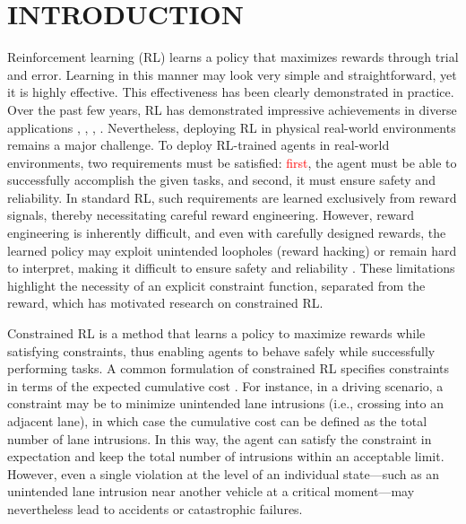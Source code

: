 \section{INTRODUCTION}

Reinforcement learning (RL) learns a policy that maximizes rewards through trial and error.
Learning in this manner may look very simple and straightforward, yet it is highly effective.
This effectiveness has been clearly demonstrated in practice.
Over the past few years, RL has demonstrated impressive achievements in diverse applications \cite{silver2017mastering}, \cite{andrychowicz2020learning}, \cite{schrittwieser2020mastering}, \cite{ouyang2022training}.
Nevertheless, deploying RL in physical real-world environments remains a major challenge.
To deploy RL-trained agents in real-world environments, two requirements must be satisfied:
\textcolor{red}{first}, the agent must be able to successfully accomplish the given tasks, and second, it must ensure safety and reliability.
In standard RL, such requirements are learned exclusively from reward signals, thereby necessitating careful reward engineering.
However, reward engineering is inherently difficult, and even with carefully designed rewards, the learned policy may exploit unintended loopholes (reward hacking) or remain hard to interpret, making it difficult to ensure safety and reliability \cite{amodei2016concrete}.
These limitations highlight the necessity of an explicit constraint function, separated from the reward, which has motivated research on constrained RL.

Constrained RL is a method that learns a policy to maximize rewards while satisfying constraints, thus enabling agents to behave safely while successfully performing tasks.
A common formulation of constrained RL specifies constraints in terms of the expected cumulative cost \cite{brunke2022safe}.
For instance, in a driving scenario, a constraint may be to minimize unintended lane intrusions (i.e., crossing into an adjacent lane), in which case the cumulative cost can be defined as the total number of lane intrusions.
In this way, the agent can satisfy the constraint in expectation and keep the total number of intrusions within an acceptable limit.
However, even a single violation at the level of an individual state---such as an unintended lane intrusion near another vehicle at a critical moment---may nevertheless lead to accidents or catastrophic failures.

